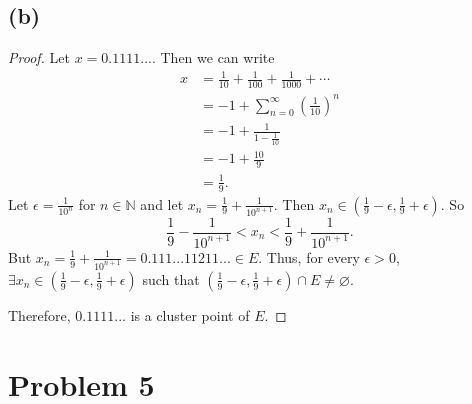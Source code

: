 \documentclass{article}
\newcommand{\N}{\mathbb{N}} %
\begin{document}
\subsection*{(b)}
\begin{proof}
	Let $x=0.1111...$. Then we can write
	\begin{align}
		x &= \frac{1}{10} + \frac{1}{100} + \frac{1}{1000} + \cdots \\
		&= -1 + \sum_{n=0}^{\infty}\left(\frac{1}{10}\right)^n \\
		&= -1 + \frac{1}{1-\frac{1}{10}} \\
		&= -1 + \frac{10}{9} \\
		&= \frac{1}{9}.
	\end{align}
	Let $\epsilon = \frac{1}{10^n}$ for $n \in \N$ and let $x_n = \frac{1}{9} + \frac{1}{10^{n+1}}$. Then $x_n \in \left(\frac{1}{9}-\epsilon, \frac{1}{9} + \epsilon\right)$. So
	\begin{equation}
		\frac{1}{9} - \frac{1}{10^{n+1}} < x_n < \frac{1}{9} + \frac{1}{10^{n+1}}.
	\end{equation}
	But $x_n = \frac{1}{9} + \frac{1}{10^{n+1}} = 0.111...11211... \in E$. Thus, for every $\epsilon > 0$, \\$\exists x_n \in \left(\frac{1}{9}-\epsilon, \frac{1}{9}+\epsilon\right)$ such that $\left(\frac{1}{9}-\epsilon, \frac{1}{9}+\epsilon\right)\cap E \neq \varnothing$.
	
	Therefore, $0.1111...$ is a cluster point of $E$.
\end{proof}
\section*{Problem 5}
\end{document}
